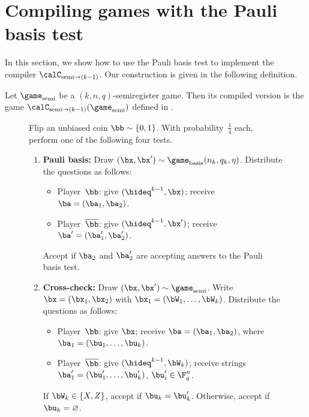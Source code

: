 \section{Compiling games with the Pauli basis test}\label{sec:pauli-basis-compiler}

In this section, we show how to use the Pauli basis test to implement the compiler $\calC_{\mathrm{semi}\rightarrow (k-1)}$.
Our construction is given in the following definition.

\begin{definition}
Let $\game_{\mathrm{semi}}$ be a $(k,n,q)$-semiregister game.
Then its compiled version is the game $\calC_{\mathrm{semi} \rightarrow (k-1)}(\game_{\mathrm{semi}})$ defined in .
\end{definition}
{
\begin{figure}
Flip an unbiased coin $\bb \sim \{0, 1\}$. 
With probability~$\tfrac{1}{4}$ each, perform one of the following four tests.
\begin{enumerate}
	\item \textbf{Pauli basis:} Draw $(\bx, \bx') \sim \game_{\mathrm{basis}}(n_k, q_k, \eta)$.\label{item:first-layer-pauli-basis}
			Distribute the questions as follows:
				\begin{itemize}
				\item[$\circ$] Player~$\bb$: give $(\hideq^{k-1}, \bx)$; receive $\ba = (\ba_1, \ba_2)$.
				\item[$\circ$] Player~$\overline{\bb}$: give $(\hideq^{k-1}, \bx')$; receive $\ba' = (\ba_1', \ba_2')$.
				\end{itemize}
			Accept if $\ba_2$ and $\ba_2'$ are accepting answers to the Pauli basis test.
	\item \textbf{Cross-check:} Draw $(\bx, \bx') \sim \game_{\mathrm{semi}}$. Write $\bx = (\bx_1, \bx_2)$
			with $\bx_1 = (\bW_1, \ldots, \bW_k)$.
			\label{item:first-layer-cross-check}
			Distribute the questions as follows:
				\begin{itemize}
				\item[$\circ$] Player~$\bb$: give $\bx$; receive $\ba = (\ba_1, \ba_2)$,
							where $\ba_1 = (\bu_1, \ldots, \bu_k)$.
				\item[$\circ$] Player~$\overline{\bb}$: give $(\hideq^{k-1}, \bW_k)$;
							receive strings $\ba_1' = (\bu_1', \ldots, \bu_k')$, $\bu_i' \in \F_q^n$.
				\end{itemize}
				If $\bW_k \in \{X, Z\}$, accept if $\bu_k = \bu_k'$.  Otherwise, accept if $\bu_k = \varnothing$.

\end{enumerate}
\end{figure}}
